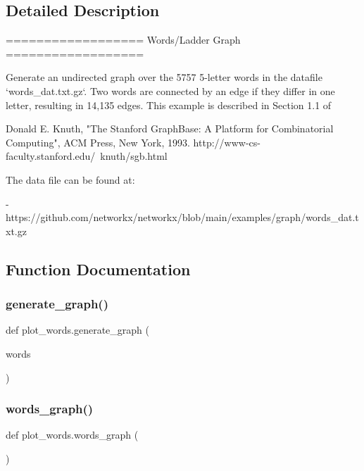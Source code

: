\subsection{Detailed Description}
\begin{DoxyVerb}==================
Words/Ladder Graph
==================

Generate  an undirected graph over the 5757 5-letter words in the datafile
`words_dat.txt.gz`.  Two words are connected by an edge if they differ in one
letter, resulting in 14,135 edges. This example is described in Section 1.1 of

Donald E. Knuth, "The Stanford GraphBase: A Platform for Combinatorial
Computing", ACM Press, New York, 1993.
http://www-cs-faculty.stanford.edu/~knuth/sgb.html

The data file can be found at:

- https://github.com/networkx/networkx/blob/main/examples/graph/words_dat.txt.gz
\end{DoxyVerb}
 

\subsection{Function Documentation}
\mbox{\label{namespaceplot__words_a0b9e0f0b837a0442bb974deab3221fd1}} 
\subsubsection{\texorpdfstring{generate\+\_\+graph()}{generate\_graph()}}
{\footnotesize\ttfamily def plot\+\_\+words.\+generate\+\_\+graph (\begin{DoxyParamCaption}\item[{}]{words }\end{DoxyParamCaption})}

\mbox{\label{namespaceplot__words_a521140919bcb56aa6bcdfe70f9261e7f}} 
\subsubsection{\texorpdfstring{words\+\_\+graph()}{words\_graph()}}
{\footnotesize\ttfamily def plot\+\_\+words.\+words\+\_\+graph (\begin{DoxyParamCaption}{ }\end{DoxyParamCaption})}

